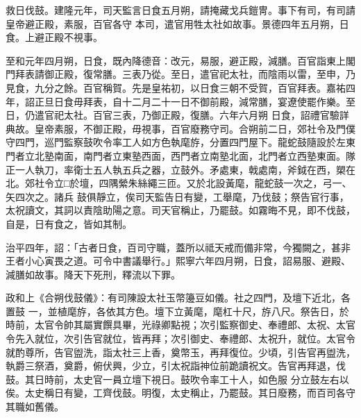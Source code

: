 \begin{pinyinscope}
 救日伐鼓。建隆元年，司天監言日食五月朔，請掩藏戈兵鎧冑。事下有司，有司請皇帝避正殿，素服，百官各守
 本司，遣官用牲太社如故事。景德四年五月朔，日食。上避正殿不視事。



 至和元年四月朔，日食，既內降德音：改元，易服，避正殿，減膳。百官詣東上閣門拜表請御正殿，復常膳。三表乃從。至日，遣官祀太社，而陰雨以雷，至申，乃見食，九分之餘。百官稱賀。先是皇祐初，以日食三朝不受賀，百官拜表。嘉祐四年，詔正旦日食毋拜表，自十二月二十一日不御前殿，減常膳，宴遼使罷作樂。至日，仍遣官祀太社。百官三表，乃御正殿，復膳。六年六月朔
 日食，詔禮官驗詳典故。皇帝素服，不御正殿，毋視事，百官廢務守司。合朔前二日，郊社令及門僕守四門，巡門監察鼓吹令率工人如方色執麾斿，分置四門屋下。龍蛇鼓隨設於左東門者立北塾南面，南門者立東塾西面，西門者立南塾北面，北門者立西塾東面。隊正一人執刀，率衛士五人執五兵之器，立鼓外。矛處東，戟處南，斧鉞在西，槊在北。郊社令立□於壇，四隅縈朱絲繩三匝。又於北設黃麾，龍蛇鼓一次之，弓一、矢四次之。諸兵
 鼓俱靜立，俟司天監告日有變，工舉麾，乃伐鼓；祭告官行事，太祝讀文，其詞以責陰助陽之意。司天官稱止，乃罷鼓。如霧晦不見，即不伐鼓，自是，日有食之，皆如其制。



 治平四年，詔：「古者日食，百司守職，蓋所以祗天戒而備非常，今獨闕之，甚非王者小心寅畏之道。可令中書議舉行。」熙寧六年四月朔，日食，詔易服、避殿、減膳如故事。降天下死刑，釋流以下罪。



 政和上《合朔伐鼓儀》：有司陳設太社玉幣籩豆如儀。社之四門，及壇下近北，各置鼓
 一，並植麾斿，各依其方色。壇下立黃麾，麾杠十尺，斿八尺。祭告日，於時前，太官令帥其屬實饌具畢，光祿卿點視；次引監察御史、奉禮郎、太祝、太官令先入就位，次引告官就位，皆再拜；次引御史、奉禮郎、太祝升，就位。太官令就酌尊所，告官盥洗，詣太社三上香，奠幣玉，再拜復位。少頃，引告官再盥洗，執爵三祭酒，奠爵，俯伏興，少立，引太祝詣神位前跪讀祝文。告官再拜退，伐鼓。其日時前，太史官一員立壇下視日。鼓吹令率工十人，如色服
 分立鼓左右以俟。太史稱日有變，工齊伐鼓。明復，太史稱止，乃罷鼓。其日廢務，而百司各守其職如舊儀。



\end{pinyinscope}